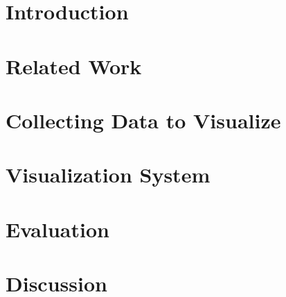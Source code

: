 \documentclass[conference]{IEEEtran}
\begin{document}
\section{Introduction}


\section{Related Work}


\section{Collecting Data to Visualize}


\section{Visualization System}


\section{Evaluation}


\section{Discussion}

\end{document}
